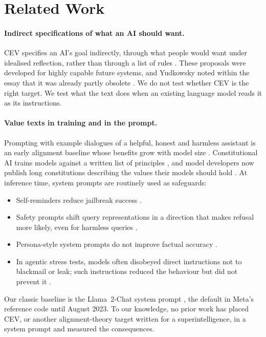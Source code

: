 \section{Related Work}
\label{sec:related}

\paragraph{Indirect specifications of what an AI should want.}
CEV specifies an AI's goal indirectly, through what people would want under idealised reflection, rather than through
a list of rules \citep{yudkowsky2004cev}. These proposals were developed
for highly capable future systems, and Yudkowsky noted within the essay that it was already partly obsolete
\citep[\S1 and \S3.3]{yudkowsky2004cev}. We do not test
whether CEV is the right target. We test what the text does when an existing language model reads it as its
instructions.

\paragraph{Value texts in training and in the prompt.}
Prompting with example dialogues of a helpful, honest and harmless assistant is an early alignment baseline whose
benefits grow with model size \citep{askell2021general}. Constitutional AI trains models against a written list of
principles \citep{bai2022constitutional}, and model developers now publish long constitutions describing the values
their models should hold \citep{anthropic2026constitution}. At inference time, system prompts are routinely used as
safeguards:
\begin{itemize}
  \item Self-reminders reduce jailbreak success \citep{xie2023selfreminder}.
  \item Safety prompts shift query representations in a direction that makes refusal more likely, even for harmless
  queries \citep{zheng2024safeguarding}.
  \item Persona-style system prompts do not improve factual accuracy \citep{zheng2024helpful}.
  \item In agentic stress tests, models often disobeyed direct instructions not to blackmail or leak; such
  instructions reduced the behaviour but did not prevent it \citep{lynch2025agentic}.
\end{itemize}
Our classic baseline is the Llama~2-Chat system prompt \citep{touvron2023llama2}, the default in Meta's reference code
until August 2023. To our knowledge, no prior work
has placed CEV, or another alignment-theory target written for a superintelligence, in a system prompt and measured
the consequences.

